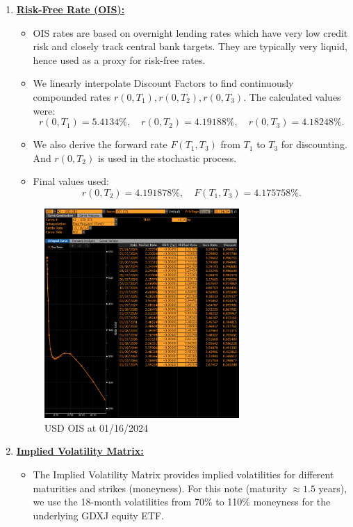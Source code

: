 \documentclass[12pt,a4paper]{article}
\begin{document}
\begin{enumerate}
\label{app:ois}
\item \underline{\textbf{Risk-Free Rate (OIS):}}
	\begin{itemize}
	\item OIS rates are based on overnight lending rates which have very low credit risk and closely track central bank targets. They are typically very liquid, hence used as a proxy for risk-free rates.
	\item We linearly interpolate Discount Factors to find continuously compounded rates \( r(0,T_1), r(0,T_2), r(0,T_3)\). The calculated values were:
	\[
	   r(0,T_1) = 5.4134\%, \quad r(0,T_2) = 4.19188\%, \quad r(0,T_3) = 4.18248\%.
	\]
	\item We also derive the forward rate \(F(T_1, T_3)\) from \(T_1\) to \(T_3\) for discounting. And \(r(0,T_2)\) is used in the stochastic process.
	\item Final values used:
	\[
	   r(0,T_2) = 4.191878\%, 
	   \quad
	   F(T_1, T_3) = 4.175758\%.
	\]
	\end{itemize}

\begin{figure}[H]
    \centering
    \includegraphics[width=0.7\textwidth, height=0.41\textheight]{images_project_3/ois.png}
    \caption{USD OIS at 01/16/2024}
    \label{fig:yourlabel}
\end{figure}

\item \underline{\textbf{Implied Volatility Matrix:}}
	\begin{itemize}
	\item The Implied Volatility Matrix provides implied volatilities for different maturities and strikes (moneyness). For this note (maturity \(\approx 1.5\) years), we use the 18-month volatilities from 70\% to 110\% moneyness for the underlying GDXJ equity ETF.
	\end{itemize}


\end{enumerate}
\end{document}
